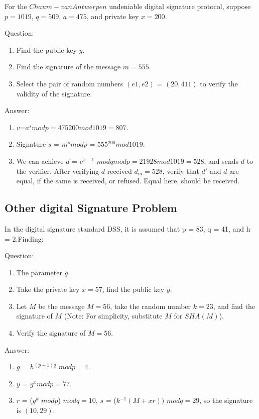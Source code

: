 \documentclass[paper=a4, fontsize=11pt]{scrartcl} %
\numberwithin{equation}{section} %
\numberwithin{figure}{section} %
\numberwithin{table}{section} %
\begin{document}
For the $Chaum-van Antwerpen$ undeniable digital signature protocol, suppose $p = 1019$, $q = 509$, $a = 475$, and private key $x = 200$.

Question:
\begin{enumerate}
\item Find the public key $y$.
\item Find the signature of the message $m = 555$.
\item Select the pair of random numbers $(e1, e2)$ = $(20, 411)$ to verify the validity of the signature.
\end{enumerate}

Answer:
\begin{enumerate}
\item $v$=$a^s mod p=475200 mod 1019=807$.
\item Signature $s$ = $m^s mod p$ = $555$$^{200} mod 1019$.
\item We can achieve $d$ = $c$$^{x-1}$ $mod q mod p = 21928 mod 1019 = 528$, and sends $d$ to the verifier. After verifying $d$ received $d$$_m  = 528$, verify that $d'$ and $d$ are equal, if the same is received, or refused. Equal here, should be received.
\end{enumerate}


\subsection{Other digital Signature Problem \uppercase\expandafter{}}

In the digital signature standard DSS, it is assumed that p = 83, q = 41, and h = 2.Finding:

Question:
\begin{enumerate}
\item The parameter $g$.
\item Take the private key $x = 57$, find the public key $y$.
\item Let $M$ be the message $M = 56$, take the random number $k = 23$, and find the signature of $M$ (Note: For simplicity, substitute $M$ for $SHA(M)$).
\item Verify the signature of $M = 56$.
\end{enumerate}

Answer:
\begin{enumerate}
\item $g$ = $h$$^{(p-1)q}$ $mod p = 4$.
\item $y$ = $g^x mod p = 77$.
\item $r$ = ($g^k$ $mod p$) $mod q = 10$, $s$ = ($k$$^{-1} (M + xr))$ $mod q = 29$, so the signature is $(10, 29)$.
\end{enumerate}
\end{document}
